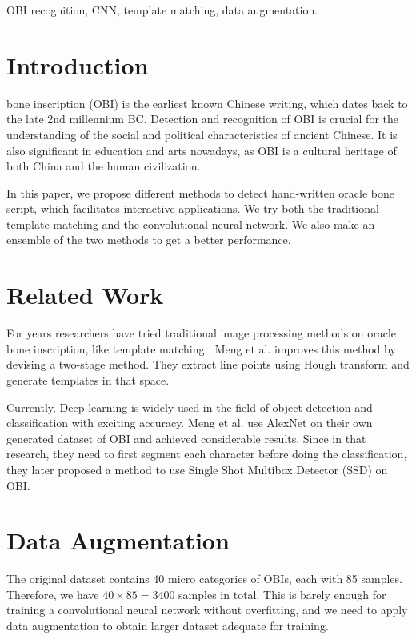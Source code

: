 \documentclass[journal]{IEEEtran}
\begin{document}
\begin{IEEEkeywords}
	OBI recognition, CNN, template matching, data augmentation.
\end{IEEEkeywords}


\IEEEpeerreviewmaketitle



\section{Introduction}
 bone inscription (OBI) is the earliest known Chinese writing, which dates back to the late 2nd millennium BC. Detection and recognition of OBI is crucial for the understanding of the social and political characteristics of ancient Chinese. It is also significant in education and arts nowadays, as OBI is a cultural heritage of both China and the human civilization.

In this paper, we propose different methods to detect hand-written oracle bone script, which facilitates interactive applications. We try both the traditional template matching and the convolutional neural network. We also make an ensemble of the two methods to get a better performance.

\section{Related Work}
For years researchers have tried traditional image processing methods on oracle bone inscription, like template matching \cite{tm}. Meng et al. \cite{tm1} improves this method by devising a two-stage method. They extract line points using Hough transform and generate templates in that space. 

Currently, Deep learning is widely used in the field of object detection and classification with exciting accuracy. Meng et al. \cite{conv} use AlexNet on their own generated dataset of OBI and achieved considerable results. Since in that research, they need to first segment each character before doing the classification, they later proposed a method \cite{ssd} to use Single Shot Multibox Detector (SSD) on OBI.


\section{Data Augmentation}
The original dataset contains 40 micro categories of OBIs, each with 85 samples.
Therefore, we have $40 \times 85 = 3400$ samples in total.
This is barely enough for training a convolutional neural network without overfitting, and we need to apply data augmentation to obtain larger dataset adequate for training.
\end{document}
